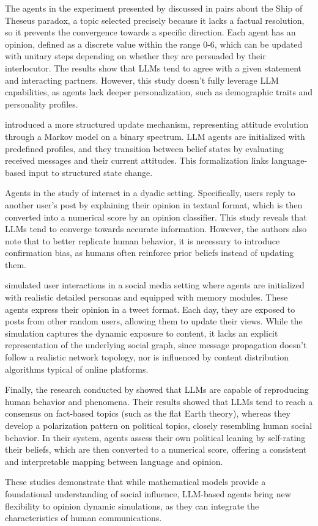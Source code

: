 The agents in the experiment presented by \citet{cau2025languagedrivenopiniondynamicsagentbased} discussed in pairs about the Ship of Theseus paradox, a topic selected precisely because it lacks a factual resolution, so it prevents the convergence towards a specific direction.
Each agent has an opinion, defined as a discrete value within the range 0-6, which can be updated with unitary steps depending on whether they are persuaded by their interlocutor.
The results show that LLMs tend to agree with a given statement and interacting partners. However, this study doesn't fully leverage LLM capabilities, as agents lack deeper personalization, such as demographic traits and personality profiles.

\citet{gao2023s3socialnetworksimulationlarge} introduced a more structured update mechanism, representing attitude evolution through a Markov model on a binary spectrum. 
LLM agents are initialized with predefined profiles, and they transition between belief states by evaluating received messages and their current attitudes.
This formalization links language-based input to structured state change.

Agents in the study of \citet{chuang2024simulatingopiniondynamicsnetworks} interact in a dyadic setting. Specifically, users reply to another user's post by explaining their opinion in textual format, which is then converted into a numerical score by an opinion classifier.
This study reveals that LLMs tend to converge towards accurate information. However, the authors also note that to better replicate human behavior, it is necessary to introduce confirmation bias, as humans often reinforce prior beliefs instead of updating them.

\citet{Liu_2024} simulated user interactions in a social media setting where agents are initialized with realistic detailed personas and equipped with memory modules.
These agents express their opinion in a tweet format. 
Each day, they are exposed to posts from other random users, allowing them to update their views.
While the simulation captures the dynamic exposure to content, it lacks an explicit representation of the underlying social graph, since message propagation doesn't follow a realistic network topology, nor is influenced by content distribution algorithms typical of online platforms.

Finally, the research conducted by \citet{piao2025emergencehumanlikepolarizationlarge} showed that LLMs are capable of reproducing human behavior and phenomena. 
Their results showed that LLMs tend to reach a consensus on fact-based topics (such as the flat Earth theory), whereas they develop a polarization pattern on political topics, closely resembling human social behavior.
In their system, agents assess their own political leaning by self-rating their beliefs, which are then converted to a numerical score, offering a consistent and interpretable mapping between language and opinion.

\medskip
These studies demonstrate that while mathematical models provide a foundational understanding of social influence, LLM-based agents bring new flexibility to opinion dynamic simulations, as they can integrate the characteristics of human communications.



